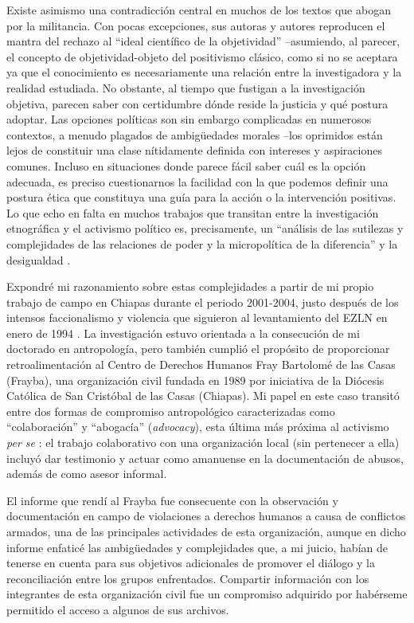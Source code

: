 \documentclass[
  spanish,
  11pt,
  a4paper,
]{scrbook}
\begin{document}
Existe asimismo una contradicción central en muchos de los textos que
abogan por la militancia. Con pocas excepciones, sus autoras y autores
reproducen el mantra del rechazo al ``ideal científico de la
objetividad'' --asumiendo, al parecer, el concepto de objetividad-objeto
del positivismo clásico, como si no se aceptara ya que el conocimiento
es necesariamente una relación entre la investigadora y la realidad
estudiada. No obstante, al tiempo que fustigan a la investigación
objetiva, parecen saber con certidumbre dónde reside la justicia y qué
postura adoptar. Las opciones políticas son sin embargo complicadas en
numerosos contextos, a menudo plagados de ambigüedades morales --los
oprimidos están lejos de constituir una clase nítidamente definida con
intereses y aspiraciones comunes. Incluso en situaciones donde parece
fácil saber cuál es la opción adecuada, es preciso cuestionarnos la
facilidad con la que podemos definir una postura ética que constituya
una guía para la acción o la intervención positivas. Lo que echo en
falta en muchos trabajos que transitan entre la investigación
etnográfica y el activismo político es, precisamente, un ``análisis de
las sutilezas y complejidades de las relaciones de poder y la
micropolítica de la diferencia'' y la desigualdad
\autocite[371]{Gledhill2000}.

Expondré mi razonamiento sobre estas complejidades a partir de mi propio
trabajo de campo en Chiapas durante el periodo 2001-2004, justo después
de los intensos faccionalismo y violencia que siguieron al levantamiento
del EZLN en enero de 1994 \autocite{AgudoSanchiz2010}. La investigación
estuvo orientada a la consecución de mi doctorado en antropología, pero
también cumplió el propósito de proporcionar retroalimentación al Centro
de Derechos Humanos Fray Bartolomé de las Casas (Frayba), una
organización civil fundada en 1989 por iniciativa de la Diócesis
Católica de San Cristóbal de las Casas (Chiapas). Mi papel en este caso
transitó entre dos formas de compromiso antropológico caracterizadas
como ``colaboración'' y ``abogacía'' (\emph{advocacy}), esta última más
próxima al activismo \emph{per se} \autocite[209-211]{Low2010} : el
trabajo colaborativo con una organización local (sin pertenecer a ella)
incluyó dar testimonio y actuar como amanuense en la documentación de
abusos, además de como asesor informal.

El informe que rendí al Frayba fue consecuente con la observación y
documentación en campo de violaciones a derechos humanos a causa de
conflictos armados, una de las principales actividades de esta
organización, aunque en dicho informe enfaticé las ambigüedades y
complejidades que, a mi juicio, habían de tenerse en cuenta para sus
objetivos adicionales de promover el diálogo y la reconciliación entre
los grupos enfrentados. Compartir información con los integrantes de
esta organización civil fue un compromiso adquirido por habérseme
permitido el acceso a algunos de sus archivos.
\end{document}

